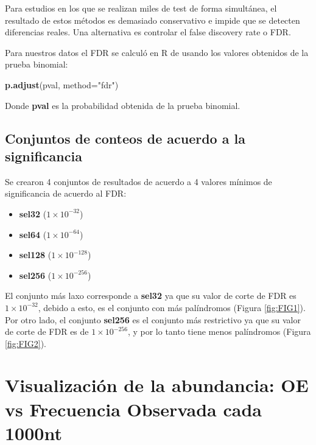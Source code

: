 \documentclass[
]{book}
\newenvironment{Shaded}{\begin{snugshade}}{\end{snugshade}}
\newcommand{\AttributeTok}[1]{\textcolor[rgb]{0.13,0.29,0.53}{#1}}
\newcommand{\FunctionTok}[1]{\textcolor[rgb]{0.13,0.29,0.53}{\textbf{#1}}}
\newcommand{\NormalTok}[1]{#1}
\newcommand{\StringTok}[1]{\textcolor[rgb]{0.31,0.60,0.02}{#1}}
\providecommand{\tightlist}{%
  \setlength{\itemsep}{0pt}\setlength{\parskip}{0pt}}
\begin{document}
Para estudios en los que se realizan miles de test de forma simultánea, el resultado de estos métodos es demasiado conservativo e impide que se detecten diferencias reales. Una alternativa es controlar el false discovery rate o FDR.

Para nuestros datos el FDR se calculó en R de usando los valores obtenidos de la prueba binomial:

\begin{Shaded}
\begin{Highlighting}[]
\FunctionTok{p.adjust}\NormalTok{(pval, }\AttributeTok{method=}\StringTok{"fdr"}\NormalTok{)}
\end{Highlighting}
\end{Shaded}

Donde \textbf{pval} es la probabilidad obtenida de la prueba binomial.

\hypertarget{conjuntos-de-conteos-de-acuerdo-a-la-significancia}{%
\subsection{Conjuntos de conteos de acuerdo a la significancia}\label{conjuntos-de-conteos-de-acuerdo-a-la-significancia}}

Se crearon 4 conjuntos de resultados de acuerdo a 4 valores mínimos de significancia de acuerdo al FDR:

\begin{itemize}
\tightlist
\item
  \textbf{sel32} (\(1 \times 10^{-32}\))
\item
  \textbf{sel64} (\(1 \times 10^{-64}\))
\item
  \textbf{sel128} (\(1 \times 10^{-128}\))
\item
  \textbf{sel256} (\(1 \times 10^{-256}\))
\end{itemize}

El conjunto más laxo corresponde a \textbf{sel32} ya que su valor de corte de FDR es \(1 \times 10^{-32}\), debido a esto, es el conjunto con más palíndromos (Figura \ref{fig:FIG1}). Por otro lado, el conjunto \textbf{sel256} es el conjunto más restrictivo ya que su valor de corte de FDR es de \(1 \times 10^{-256}\), y por lo tanto tiene menos palíndromos (Figura \ref{fig:FIG2}).

\hypertarget{visualizaciuxf3n-de-la-abundancia-oe-vs-frecuencia-observada-cada-1000nt}{%
\section{Visualización de la abundancia: OE vs Frecuencia Observada cada 1000nt}\label{visualizaciuxf3n-de-la-abundancia-oe-vs-frecuencia-observada-cada-1000nt}}
\end{document}

